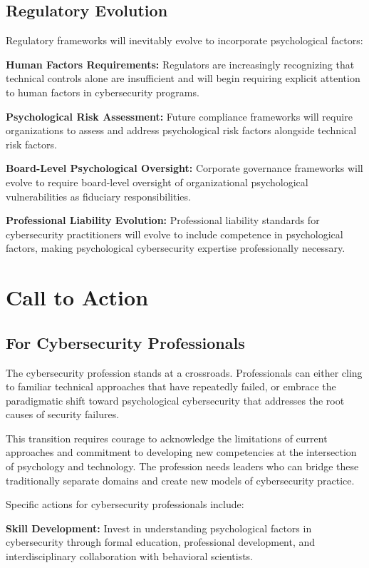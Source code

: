 \documentclass[10pt, twocolumn]{article}
\begin{document}
\subsection{Regulatory Evolution}

Regulatory frameworks will inevitably evolve to incorporate psychological factors:

\textbf{Human Factors Requirements:} Regulators are increasingly recognizing that technical controls alone are insufficient and will begin requiring explicit attention to human factors in cybersecurity programs.

\textbf{Psychological Risk Assessment:} Future compliance frameworks will require organizations to assess and address psychological risk factors alongside technical risk factors.

\textbf{Board-Level Psychological Oversight:} Corporate governance frameworks will evolve to require board-level oversight of organizational psychological vulnerabilities as fiduciary responsibilities.

\textbf{Professional Liability Evolution:} Professional liability standards for cybersecurity practitioners will evolve to include competence in psychological factors, making psychological cybersecurity expertise professionally necessary.

\section{Call to Action}

\subsection{For Cybersecurity Professionals}

The cybersecurity profession stands at a crossroads. Professionals can either cling to familiar technical approaches that have repeatedly failed, or embrace the paradigmatic shift toward psychological cybersecurity that addresses the root causes of security failures.

This transition requires courage to acknowledge the limitations of current approaches and commitment to developing new competencies at the intersection of psychology and technology. The profession needs leaders who can bridge these traditionally separate domains and create new models of cybersecurity practice.

Specific actions for cybersecurity professionals include:

\textbf{Skill Development:} Invest in understanding psychological factors in cybersecurity through formal education, professional development, and interdisciplinary collaboration with behavioral scientists.
\end{document}
